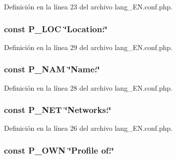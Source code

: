 Definición en la línea 23 del archivo lang\-\_\-\-E\-N.\-conf.\-php.

\hypertarget{lang__EN_8conf_8php_ac5de6ba666c926e6b375d153846010c3}{
\subsubsection[{P\-\_\-\-L\-O\-C}]{\setlength{\rightskip}{0pt plus 5cm}const P\-\_\-\-L\-O\-C \char`\"{}Location\-:\char`\"{}}}\label{lang__EN_8conf_8php_ac5de6ba666c926e6b375d153846010c3}


Definición en la línea 29 del archivo lang\-\_\-\-E\-N.\-conf.\-php.

\hypertarget{lang__EN_8conf_8php_a298d6af9ed729c17543a14644e5be675}{
\subsubsection[{P\-\_\-\-N\-A\-M}]{\setlength{\rightskip}{0pt plus 5cm}const P\-\_\-\-N\-A\-M \char`\"{}Name\-:\char`\"{}}}\label{lang__EN_8conf_8php_a298d6af9ed729c17543a14644e5be675}


Definición en la línea 28 del archivo lang\-\_\-\-E\-N.\-conf.\-php.

\hypertarget{lang__EN_8conf_8php_a7b08d18ad2a5adbaae77bea17fd408bf}{
\subsubsection[{P\-\_\-\-N\-E\-T}]{\setlength{\rightskip}{0pt plus 5cm}const P\-\_\-\-N\-E\-T \char`\"{}Networks\-:\char`\"{}}}\label{lang__EN_8conf_8php_a7b08d18ad2a5adbaae77bea17fd408bf}


Definición en la línea 26 del archivo lang\-\_\-\-E\-N.\-conf.\-php.

\hypertarget{lang__EN_8conf_8php_ac1d527ffba12018124c595f2ad74c851}{
\subsubsection[{P\-\_\-\-O\-W\-N}]{\setlength{\rightskip}{0pt plus 5cm}const P\-\_\-\-O\-W\-N \char`\"{}Profile of\-:\char`\"{}}}\label{lang__EN_8conf_8php_ac1d527ffba12018124c595f2ad74c851}


